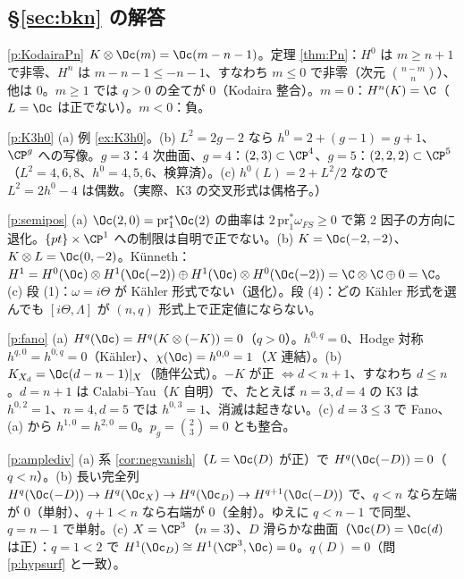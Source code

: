 \subsection*{\S\ref{sec:bkn} の解答}
\begin{sol}{\ref{p:KodairaPn}}
$K\otimes\Oc(m)=\Oc(m-n-1)$。定理 \ref{thm:Pn}：$H^0$ は $m\ge n+1$ で非零、$H^n$ は $m-n-1\le-n-1$、すなわち $m\le0$ で非零（次元 $\binom{n-m}n$）、他は $0$。$m\ge1$ では $q>0$ の全てが $0$（Kodaira 整合）。$m=0$：$H^n(K)=\C$（$L=\Oc$ は正でない）。$m<0$：負。
\end{sol}
\begin{sol}{\ref{p:K3h0}}
(a) 例 \ref{ex:K3h0}。(b) $L^2=2g-2$ なら $h^0=2+(g-1)=g+1$、$\CP^g$ への写像。$g=3$：4 次曲面、$g=4$：$(2,3)\subset\CP^4$、$g=5$：$(2,2,2)\subset\CP^5$（$L^2=4,6,8$、$h^0=4,5,6$、検算済）。(c) $h^0(L)=2+L^2/2$ なので $L^2=2h^0-4$ は偶数。（実際、K3 の交叉形式は偶格子。）
\end{sol}
\begin{sol}{\ref{p:semipos}}
(a) $\Oc(2,0)=\mathrm{pr}_1^*\Oc(2)$ の曲率は $2\,\mathrm{pr}_1^*\omega_{FS}\ge0$ で第 2 因子の方向に退化。$\{pt\}\times\CP^1$ への制限は自明で正でない。(b) $K=\Oc(-2,-2)$、$K\otimes L=\Oc(0,-2)$。Künneth：$H^1=H^0(\Oc)\otimes H^1(\Oc(-2))\oplus H^1(\Oc)\otimes H^0(\Oc(-2))=\C\otimes\C\oplus0=\C$。(c) 段 (1)：$\omega=i\Theta$ が Kähler 形式でない（退化）。段 (4)：どの Kähler 形式を選んでも $[i\Theta,\Lambda]$ が $(n,q)$ 形式上で正定値にならない。
\end{sol}
\begin{sol}{\ref{p:fano}}
(a) $H^q(\Oc)=H^q(K\otimes(-K))=0$（$q>0$）。$h^{0,q}=0$、Hodge 対称 $h^{q,0}=h^{0,q}=0$（Kähler）、$\chi(\Oc)=h^{0,0}=1$（$X$ 連結）。(b) $K_{X_d}=\Oc(d-n-1)|_X$（随伴公式）。$-K$ が正 $\iff d<n+1$、すなわち $d\le n$。$d=n+1$ は Calabi--Yau（$K$ 自明）で、たとえば $n=3,d=4$ の K3 は $h^{0,2}=1$、$n=4,d=5$ では $h^{0,3}=1$、消滅は起きない。(c) $d=3\le3$ で Fano、(a) から $h^{1,0}=h^{2,0}=0$。$p_g=\binom23=0$ とも整合。
\end{sol}
\begin{sol}{\ref{p:amplediv}}
(a) 系 \ref{cor:negvanish}（$L=\Oc(D)$ が正）で $H^q(\Oc(-D))=0$（$q<n$）。(b) 長い完全列 $H^q(\Oc(-D))\to H^q(\Oc_X)\to H^q(\Oc_D)\to H^{q+1}(\Oc(-D))$ で、$q<n$ なら左端が $0$（単射）、$q+1<n$ なら右端が $0$（全射）。ゆえに $q<n-1$ で同型、$q=n-1$ で単射。(c) $X=\CP^3$（$n=3$）、$D$ 滑らかな曲面（$\Oc(D)=\Oc(d)$ は正）：$q=1<2$ で $H^1(\Oc_D)\cong H^1(\CP^3,\Oc)=0$。$q(D)=0$（問 \ref{p:hypsurf} と一致）。
\end{sol}

